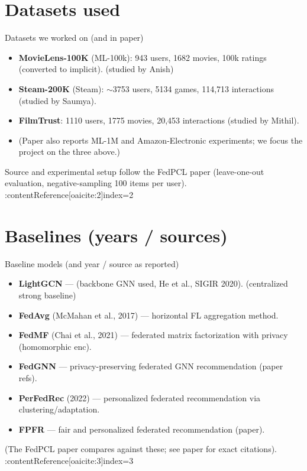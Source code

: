 \documentclass{beamer}
\begin{document}
\section{Datasets used}
\begin{frame}{Datasets we worked on (and in paper)}
  \begin{itemize}
    \item \textbf{MovieLens-100K} (ML-100k): 943 users, 1682 movies, 100k ratings (converted to implicit). (studied by Anish)
    \item \textbf{Steam-200K} (Steam): $\sim$3753 users, 5134 games, 114,713 interactions (studied by Saumya).
    \item \textbf{FilmTrust}: 1110 users, 1775 movies, 20,453 interactions (studied by Mithil).
    \item (Paper also reports ML-1M and Amazon-Electronic experiments; we focus the project on the three above.)
  \end{itemize}
  Source and experimental setup follow the FedPCL paper (leave-one-out evaluation, negative-sampling 100 items per user). :contentReference[oaicite:2]{index=2}
\end{frame}

\section{Baselines (years / sources)}
\begin{frame}{Baseline models (and year / source as reported)}
  \begin{itemize}
    \item \textbf{LightGCN} — (backbone GNN used, He et al., SIGIR 2020). (centralized strong baseline)
    \item \textbf{FedAvg} (McMahan et al., 2017) — horizontal FL aggregation method.
    \item \textbf{FedMF} (Chai et al., 2021) — federated matrix factorization with privacy (homomorphic enc).
    \item \textbf{FedGNN} — privacy-preserving federated GNN recommendation (paper refs).
    \item \textbf{PerFedRec} (2022) — personalized federated recommendation via clustering/adaptation.
    \item \textbf{FPFR} — fair and personalized federated recommendation (paper).
  \end{itemize}
  (The FedPCL paper compares against these; see paper for exact citations). :contentReference[oaicite:3]{index=3}
\end{frame}
\end{document}
